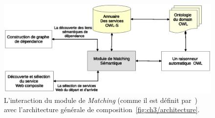 \begin{figure}[h]
    \centering
    \includegraphics[width=1.2\textwidth, center]{figs/ch3/matchmaker.eps}
    \caption{L'interaction du module de \emph{Matching} (comme il est
      définit par~\cite{paolucci2002semantic}) avec l'architecture
      générale de composition~\ref{fig:ch3/architecture}.}
    \label{fig:ch3/matchmaker}
\end{figure}
